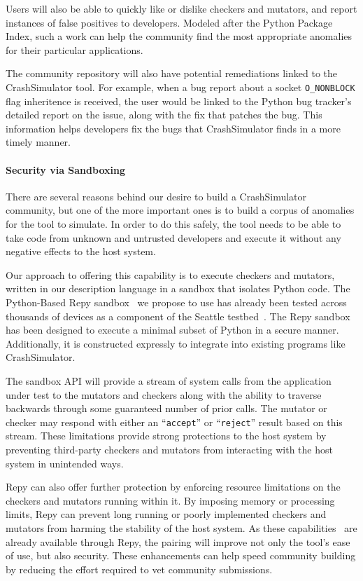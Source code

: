Users will also be able to quickly like or dislike checkers and mutators,
and report instances of false positives to developers.
Modeled after the Python Package Index,
such a work can help the community find the most appropriate
anomalies for their particular applications.

The community repository will also have potential remediations linked to
the CrashSimulator tool.  For example, when a bug report about a
socket {\tt O\_NONBLOCK} flag inheritence is received, the user would be linked
to the Python
bug tracker's detailed report on the issue, along with the fix that
patches the bug.  This information helps developers fix the
bugs that CrashSimulator finds in a more timely manner.


\paragraph{Security via Sandboxing}

There are several reasons behind our desire to build a CrashSimulator community,
but one of the more important ones
is to build a corpus of anomalies for the tool to simulate.
In order to do this safely, the tool needs to be able to
take code from unknown and untrusted developers and execute it
without any negative effects to the host system.

Our approach to offering this capability is
to execute checkers and mutators, written in our description language in a
sandbox that isolates Python code.  The Python-Based Repy
sandbox~\cite{Cappos_CCS_2010} we propose to use
has already been tested across thousands of devices as a component of
the Seattle testbed~\cite{containmentseattle}.  The Repy sandbox
has been designed to execute a minimal subset of Python in a secure manner.
Additionally, it is constructed expressly to integrate into
existing programs like CrashSimulator.

The sandbox API will provide a
stream of system calls from the application under test
to the mutators and checkers along with the ability
to traverse backwards through some guaranteed number of prior
calls.  The mutator or checker may respond with either an ``{\tt accept}'' or
``{\tt reject}'' result based on this stream.  These limitations
provide strong protections to the host system by preventing
third-party checkers and mutators from
interacting with the host system in unintended ways.

Repy can also offer further protection by enforcing resource limitations on
the checkers and mutators running within it.
By imposing memory or processing limits, Repy can prevent
long running or poorly implemented checkers and mutators from harming the
stability of the host system.
As these
capabilities~\cite{Li_USENIX_2015} are already available through Repy,
the pairing will improve
not only the tool's ease of use, but also security.
These enhancements can help speed
community building by reducing the effort required to vet
community submissions.

